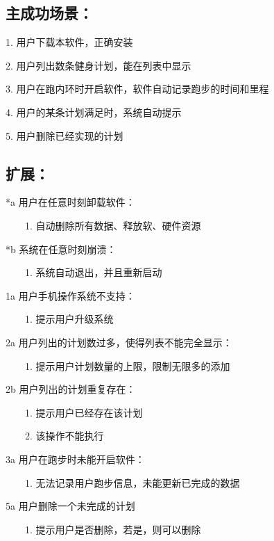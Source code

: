 \documentclass [a4paper,11pt]{article}
\begin{document}
\subsection*{主成功场景：}
	1. 用户下载本软件，正确安装
	
	2. 用户列出数条健身计划，能在列表中显示
	
	3. 用户在跑内环时开启软件，软件自动记录跑步的时间和里程
	
	4. 用户的某条计划满足时，系统自动提示
	
	5. 用户删除已经实现的计划
	
\subsection*{扩展：}
	*a 用户在任意时刻卸载软件：
	
	~~~~1. 自动删除所有数据、释放软、硬件资源
		
	*b 系统在任意时刻崩溃：
	
	~~~~1. 系统自动退出，并且重新启动
		
	1a 用户手机操作系统不支持：
	
	~~~~1. 提示用户升级系统
		
	2a 用户列出的计划数过多，使得列表不能完全显示：
	
	~~~~1. 提示用户计划数量的上限，限制无限多的添加
		
	2b 用户列出的计划重复存在：
	
	~~~~1. 提示用户已经存在该计划
		
	~~~~2. 该操作不能执行
		
	3a 用户在跑步时未能开启软件：
	
	~~~~1. 无法记录用户跑步信息，未能更新已完成的数据
		
	5a 用户删除一个未完成的计划
	
	~~~~1. 提示用户是否删除，若是，则可以删除
  
\end{document}
